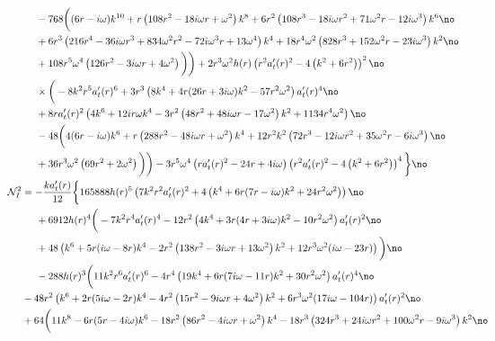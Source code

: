 \documentclass[preprintnumbers,aps,prd,longbibliography,nofootinbib,nobibnotes,amsmath,amssymb]{revtex4}
\begin{document}
		\begin{align}
		&-768 \bigg((6 r-i \omega ) k^{10}+r \left(108 r^2-18 i \omega  r+\omega ^2\right) k^8+6 r^2 \left(108 r^3-18 i \omega  r^2+71 \omega ^2 r-12 i \omega ^3\right) k^6\no\\
		&+6 r^3 \left(216 r^4-36 i \omega  r^3+834 \omega ^2 r^2-72 i \omega ^3 r+13 \omega ^4\right) k^4+18 r^4 \omega ^2 \left(828 r^3+152 \omega ^2 r-23 i \omega ^3\right) k^2\no\\
		&+108 r^5 \omega ^4 \left(126 r^2-3 i \omega  r+4 \omega ^2\right)\bigg)\bigg) +2 r^3 \omega ^2 h(r) \left(r^2 a_t'(r)^2-4 \left(k^2+6 r^2\right)\right)^2 \no\\
		&\times \bigg(-8 k^2 r^5 a_t'(r)^6+3 r^3 \left(8 k^4+4 r (26 r+3 i \omega ) k^2-57 r^2 \omega ^2\right) a_t'(r)^4\no\\
		&+8 r a_t'(r)^2 \left(4 k^6+12 i r \omega  k^4-3 r^2 \left(48 r^2+48 i \omega  r-17 \omega ^2\right) k^2+1134 r^4 \omega ^2\right) \no\\
		&-48 \bigg(4 (6 r-i \omega ) k^6+r \left(288 r^2-48 i \omega  r+\omega ^2\right) k^4+12 r^2 k^2\left(72 r^3-12 i \omega  r^2+35 \omega ^2 r-6 i \omega ^3\right) \no\\
		&+36 r^3 \omega ^2 \left(69 r^2+2 \omega ^2\right)\bigg)\bigg) -3 r^5 \omega ^4 \left(r a_t'(r)^2-24 r+4 i \omega \right) \left(r^2 a_t'(r)^2-4 \left(k^2+6 r^2\right)\right)^4\bigg\}\no\\
		&\hspace{-1cm}\mathcal{N}_I^2 = - \frac{k a_t'(r)}{12} \bigg\{165888 h(r)^5\left(7 k^2 r^2 a_t'(r)^2+4 \left(k^4+6 r (7 r-i \omega ) k^2+24 r^2 \omega ^2\right)\right)\no\\
		& +6912  h(r)^4 \bigg(-7 k^2 r^4 a_t'(r)^4-12 r^2 \left(4 k^4+3 r (4 r+3 i \omega ) k^2-10 r^2 \omega ^2\right) a_t'(r)^2\no\\
		&+48 \left(k^6+5 r (i \omega -8 r) k^4-2 r^2 \left(138 r^2-3 i \omega  r+13 \omega ^2\right) k^2+12 r^3 \omega ^2 (i \omega -23 r)\right)\bigg)\no\\
		&-288 h(r)^3 \bigg(11 k^2 r^6 a_t'(r)^6-4 r^4 \left(19 k^4+6 r (7 i \omega -11 r) k^2+30 r^2 \omega ^2\right) a_t'(r)^4\no\\
		&\hspace{-0.5cm}-48 r^2 \left(k^6+2 r (5 i \omega -2 r) k^4-4 r^2 \left(15 r^2-9 i \omega  r+4 \omega ^2\right) k^2+6 r^3 \omega ^2 (17 i \omega -104 r)\right) a_t'(r)^2\no\\
		&\hspace{-0.5cm}+64 \bigg(11 k^8-6 r (5 r-4 i \omega ) k^6-18 r^2 \left(86 r^2-4 i \omega  r+\omega ^2\right) k^4-18 r^3 \left(324 r^3+24 i \omega  r^2+100 \omega ^2 r-9 i \omega ^3\right) k^2\no\\

\end{align}
\end{document}
